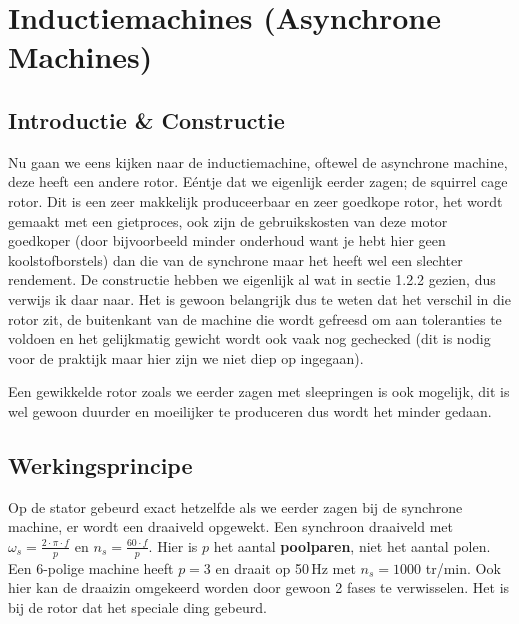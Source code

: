 \chapter{Inductiemachines (Asynchrone Machines)}

\section{Introductie \& Constructie}
Nu gaan we eens kijken naar de inductiemachine, oftewel de asynchrone machine, deze heeft
een andere rotor.
Eéntje dat we eigenlijk eerder zagen; de squirrel cage rotor.
Dit is een zeer makkelijk produceerbaar en zeer goedkope rotor, het wordt gemaakt met een
gietproces, ook zijn de gebruikskosten van deze motor goedkoper (door bijvoorbeeld minder
onderhoud want je hebt hier geen koolstofborstels) dan die van de synchrone maar het heeft
wel een slechter rendement.
De constructie hebben we eigenlijk al wat in sectie 1.2.2 gezien, dus verwijs ik daar naar.
Het is gewoon belangrijk dus te weten dat het verschil in die rotor zit, de buitenkant van
de machine die wordt gefreesd om aan toleranties te voldoen en het gelijkmatig gewicht
wordt ook vaak nog gechecked (dit is nodig voor de praktijk maar hier zijn we niet diep op
ingegaan).

Een gewikkelde rotor zoals we eerder zagen met sleepringen is ook mogelijk, dit is wel
gewoon duurder en moeilijker te produceren dus wordt het minder gedaan.

\section{Werkingsprincipe}
Op de stator gebeurd exact hetzelfde als we eerder zagen bij de synchrone machine, er
wordt een draaiveld opgewekt.
Een synchroon draaiveld met $\omega_s = \frac{2 \cdot \pi \cdot f}{p}$ en
$n_s = \frac{60 \cdot f}{p}$.
Hier is $p$ het aantal \textbf{poolparen}, niet het aantal polen. Een 6-polige machine heeft $p = 3$ en draait op 50\,Hz met $n_s = 1000$ tr/min.
Ook hier kan de draaizin omgekeerd worden door gewoon 2 fases te verwisselen.
Het is bij de rotor dat het speciale ding gebeurd.

